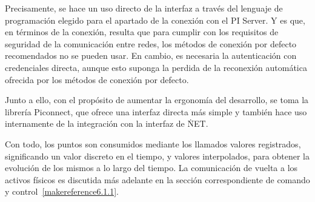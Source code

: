 Precisamente, se hace un uso directo de la interfaz a través del lenguaje de programación elegido para el apartado de la conexión con el PI Server. Y es que, en términos de la conexión, resulta que para cumplir con los requisitos de seguridad de la comunicación entre redes, los métodos de conexión por defecto recomendados no se pueden usar. En cambio, es necesaria la autenticación con credenciales directa, aunque esto suponga la perdida de la reconexión automática ofrecida por los métodos de conexión por defecto.

Junto a ello, con el propósito de aumentar la ergonomía del desarrollo, se toma la librería Piconnect, que ofrece una interfaz directa más simple y también hace uso internamente de la integración con la interfaz de \.NET\@.

Con todo, los puntos son consumidos mediante los llamados valores registrados, significando un valor discreto en el tiempo, y valores interpolados, para obtener la evolución de los mismos a lo largo del tiempo. La comunicación de vuelta a los activos físicos es discutida más adelante en la sección correspondiente de comando y control~\ref{makereference6.1.1}.
